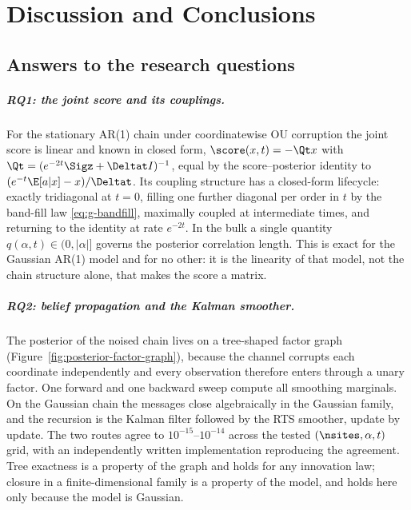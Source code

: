 \chapter{Discussion and Conclusions}\label{ch:conclusions}

\section{Answers to the research questions}\label{sec:conclusions-findings}

\paragraph{RQ1: the joint score and its couplings.} For the stationary AR(1)
chain under coordinatewise OU corruption the joint score is linear and known in
closed form, $\score(x,t) = -\Qt x$ with
$\Qt = (e^{-2t}\Sigz + \Deltat I)^{-1}$, equal by the score--posterior identity
to $(e^{-t}\E[a|x] - x)/\Deltat$. Its coupling structure has a closed-form
lifecycle: exactly tridiagonal at $t = 0$, filling one further diagonal per
order in $t$ by the band-fill law \eqref{eq:g-bandfill}, maximally coupled at
intermediate times, and returning to the identity at rate $e^{-2t}$. In the
bulk a single quantity $q(\alpha,t) \in (0, |\alpha|]$ governs the posterior
correlation length. This is exact for the Gaussian AR(1) model and for no
other: it is the linearity of that model, not the chain structure alone, that
makes the score a matrix.

\paragraph{RQ2: belief propagation and the Kalman smoother.} The posterior of
the noised chain lives on a tree-shaped factor graph
(Figure~\ref{fig:posterior-factor-graph}), because the channel corrupts each
coordinate independently and every observation therefore enters through a unary
factor. One forward and one backward sweep compute all smoothing marginals. On
the Gaussian chain the messages close algebraically in the Gaussian family, and
the recursion is the Kalman filter followed by the RTS smoother, update by
update. The two routes agree to $10^{-15}$--$10^{-14}$ across the tested
$(\nsites, \alpha, t)$ grid, with an independently written implementation
reproducing the agreement. Tree exactness is a property of the graph and holds
for any innovation law; closure in a finite-dimensional family is a property of
the model, and holds here only because the model is Gaussian.

